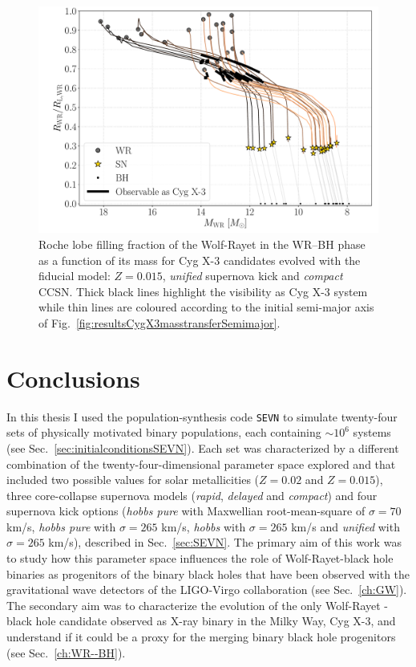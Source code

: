 \documentclass[a4paper,titlepage]{book}     	%
\begin{document}
\begin{figure}[b!]
		\centering
		\includegraphics[width=\textwidth]{./images/WR_Mass_1_RLfill1_BHBH_GW_WRBH_cyg_x-3--Ko17.pdf}	
    \caption{Roche lobe filling fraction of the Wolf-Rayet in the WR--BH phase as a function of its mass for Cyg X-3 candidates evolved with the fiducial model: $Z=0.015$, \emph{unified} supernova kick and \emph{compact} CCSN. Thick black lines highlight the visibility as Cyg X-3 system while thin lines are coloured according to the initial semi-major axis of Fig.\ \ref{fig:resultsCygX3masstransferSemimajor}.}\label{fig:resultsCygX3masstransferwindfedduration}
\end{figure}










\chapter{Conclusions}
In this thesis I used the population-synthesis code \texttt{SEVN} to simulate twenty-four sets of physically motivated binary populations, each containing $\sim 10^6$ systems (see Sec.\ \ref{sec:initialconditionsSEVN}). Each set was characterized by a different combination of the twenty-four-dimensional parameter space explored and that included two possible values for solar metallicities ($Z=0.02$ and $Z=0.015$), three core-collapse supernova models (\emph{rapid}, \emph{delayed} and \emph{compact}) and four supernova kick options (\emph{hobbs pure} with Maxwellian root-mean-square of $\sigma=70$ km/s, \emph{hobbs pure} with $\sigma=265$ km/s, \emph{hobbs} with $\sigma=265$ km/s and \emph{unified} with $\sigma=265$ km/s), described in Sec.\ \ref{sec:SEVN}. The primary aim of this work was to study how this parameter space influences the role of Wolf-Rayet-black hole binaries as progenitors of the binary black holes that have been observed with the gravitational wave detectors of the LIGO-Virgo collaboration (see Sec.\ \ref{ch:GW}). The secondary aim was to characterize the evolution of the only Wolf-Rayet - black hole candidate observed as X-ray binary in the Milky Way, Cyg X-3, and understand if it could be a proxy for the merging binary black hole progenitors (see Sec.\ \ref{ch:WR--BH}). \\
\end{document}
